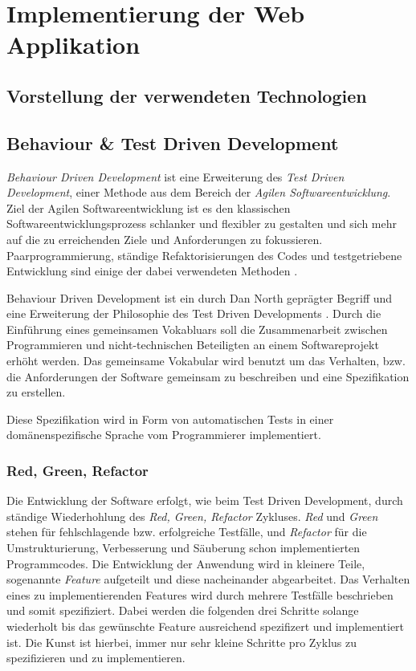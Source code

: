 \chapter{Implementierung der Web Applikation}
\section{Vorstellung der verwendeten Technologien}

\section{Behaviour \& Test Driven Development}

\textit{Behaviour Driven Development} ist eine Erweiterung des
\textit{Test Driven Development}, einer Methode aus dem Bereich der
\textit{Agilen Softwareentwicklung}. Ziel der Agilen
Softwareentwicklung ist es den klassischen Softwareentwicklungsprozess
schlanker und flexibler zu gestalten und sich mehr auf die zu
erreichenden Ziele und Anforderungen zu
fokussieren. Paarprogrammierung, ständige Refaktorisierungen des Codes
und testgetriebene Entwicklung sind einige der dabei verwendeten
Methoden \cite{wiki:agile}.

Behaviour Driven Development ist ein durch Dan North geprägter Begriff
und eine Erweiterung der Philosophie des Test Driven Developments
\cite{wiki:bdd}. Durch die Einführung eines gemeinsamen Vokabluars
soll die Zusammenarbeit zwischen Programmieren und nicht-technischen
Beteiligten an einem Softwareprojekt erhöht werden. Das gemeinsame
Vokabular wird benutzt um das Verhalten, bzw. die Anforderungen der
Software gemeinsam zu beschreiben und eine Spezifikation zu erstellen.

Diese Spezifikation wird in Form von automatischen Tests in einer
domänen\-spezifische Sprache vom Programmierer implementiert.

\subsection{Red, Green, Refactor}

Die Entwicklung der Software erfolgt, wie beim Test Driven
Development, durch ständige Wiederhohlung des \textit{Red, Green,
  Refactor} Zykluses. \textit{Red} und \textit{Green} stehen für
fehlschlagende bzw. erfolgreiche Testfälle, und \textit{Refactor} für
die Umstrukturierung, Verbesserung und Säuberung schon implementierten
Programmcodes. Die Entwicklung der Anwendung wird in kleinere Teile,
sogenannte \textit{Feature} aufgeteilt und diese nacheinander
abgearbeitet. Das Verhalten eines zu implementierenden Features wird
durch mehrere Testfälle beschrieben und somit spezifiziert. Dabei
werden die folgenden drei Schritte solange wiederholt bis das
gewünschte Feature ausreichend spezifizert und implementiert ist. Die
Kunst ist hierbei, immer nur sehr kleine Schritte pro Zyklus zu
spezifizieren und zu implementieren.

